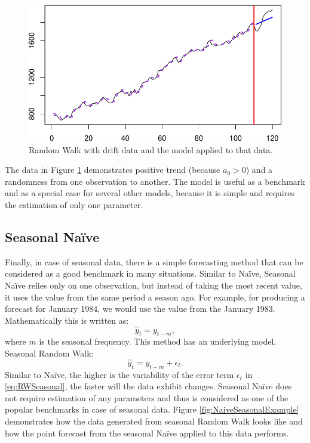 \documentclass[
]{book}
\theoremstyle{definition}
\theoremstyle{definition}
\theoremstyle{definition}
\theoremstyle{definition}
\theoremstyle{remark}
\begin{document}
\begin{figure}
\centering
\includegraphics{adam_files/figure-latex/RWDriftExample-1.pdf}
\caption{\label{fig:RWDriftExample}Random Walk with drift data and the model applied to that data.}
\end{figure}

The data in Figure \ref{fig:RWDriftExample} demonstrates positive trend (because \(a_0>0\)) and a randomness from one observation to another. The model is useful as a benchmark and as a special case for several other models, because it is simple and requires the estimation of only one parameter.

\hypertarget{NaiveSeasonal}{%
\subsection{Seasonal Naïve}\label{NaiveSeasonal}}

Finally, in case of seasonal data, there is a simple forecasting method that can be considered as a good benchmark in many situations. Similar to Naïve, Seasonal Naïve relies only on one observation, but instead of taking the most recent value, it uses the value from the same period a season ago. For example, for producing a forecast for January 1984, we would use the value from the January 1983. Mathematically this is written as:
\begin{equation}
    \hat{y}_t = y_{t-m} ,
    \label{eq:NaiveSeasonal}
\end{equation}
where \(m\) is the seasonal frequency. This method has an underlying model, Seasonal Random Walk:
\begin{equation}
    \hat{y}_t = y_{t-m} + \epsilon_t.
    \label{eq:RWSeasonal}
\end{equation}
Similar to Naïve, the higher is the variability of the error term \(\epsilon_t\) in \eqref{eq:RWSeasonal}, the faster will the data exhibit changes. Seasonal Naïve does not require estimation of any parameters and thus is considered as one of the popular benchmarks in case of seasonal data. Figure \ref{fig:NaiveSeasonalExample} demonstrates how the data generated from seasonal Random Walk looks like and how the point forecast from the seasonal Naïve applied to this data performs.
\end{document}
